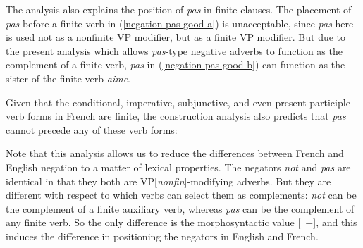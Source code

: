 \documentclass[output=paper
                ,modfonts
                ,nonflat
	        ,collection
	        ,collectionchapter
	        ,collectiontoclongg
 	        ,biblatex
                ,babelshorthands
                ,newtxmath
                ,draftmode
                ,colorlinks, citecolor=brown
]{./langsci/langscibook}
\begin{document}
{\begin{exe}
\begin{xlist}
\begin{exe}
\begin{xlist}
The analysis also explains the position of \textit{pas} in
finite clauses. The placement of \textit{pas} before a finite verb
in (\ref{negation-pas-good-a})
 is unacceptable, since
\textit{pas} here is used not as a nonfinite VP modifier, but as
a finite VP modifier. But due to the
present analysis which allows \textit{pas}-type negative adverbs
to function as the complement of a finite verb,
\textit{pas} in (\ref{negation-pas-good-b}) can function as
the sister of the finite verb
\textit{aime}.

Given that the conditional, imperative, subjunctive,
and even present participle verb forms in French are finite, the
construction
analysis also predicts that \textit{pas} cannot precede any of these verb
forms:


\eal
{}
\zl

\eal
{}
\zl

\eal
{}
\zl

\eal
{}
\zl

Note that this analysis allows us to reduce the differences between
French and English negation to a matter of lexical properties.
The negators \textit{not} and \textit{pas} are identical in that they both are
VP[\textit{nonfin}]-modifying adverbs. But they are different with respect to
which verbs can select them as complements:  \textit{not} can be the
complement of a finite auxiliary verb, whereas \textit{pas} can be the
complement of any finite verb.  So the only difference
is the morphosyntactic value [\AUX\ $+$], and this induces
the difference in positioning the negators in English and French.



%




\end{xlist}
\end{exe}
\end{xlist}
\end{exe}}
\end{document}
